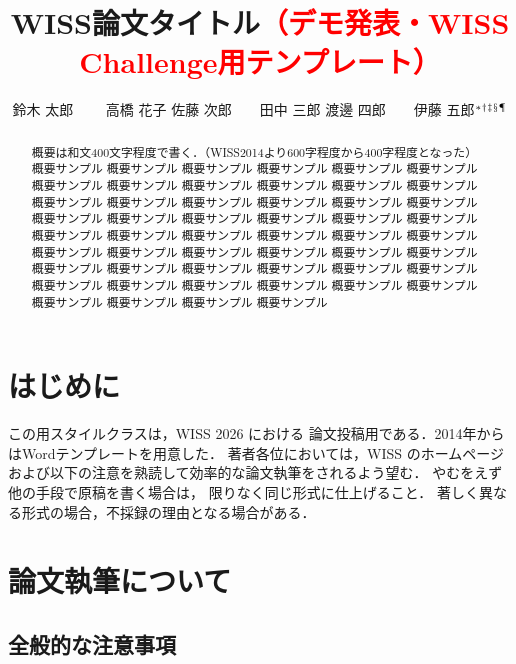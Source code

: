 \documentclass[twoside]{wiss}
\begin{document}
\title{WISS論文タイトル\textcolor{red}{（デモ発表・WISS Challenge用テンプレート）}}
\etitle{}%
%
%
%
\author{鈴木 太郎 　　高橋 花子
	佐藤 次郎　　田中 三郎
	渡邊 四郎　　伊藤 五郎${}^* {}^\dag {}^\ddag {}^\mathsection
		{}^\mathparagraph$}

\begin{abstract}
	概要は和文400文字程度で書く．（WISS2014より600字程度から400字程度となった）
	概要サンプル 概要サンプル 概要サンプル 概要サンプル 概要サンプル 概要サンプル
	概要サンプル 概要サンプル 概要サンプル 概要サンプル 概要サンプル 概要サンプル
	概要サンプル 概要サンプル 概要サンプル 概要サンプル 概要サンプル 概要サンプル
	概要サンプル 概要サンプル 概要サンプル 概要サンプル 概要サンプル 概要サンプル
	概要サンプル 概要サンプル 概要サンプル 概要サンプル 概要サンプル 概要サンプル
	概要サンプル 概要サンプル 概要サンプル 概要サンプル 概要サンプル 概要サンプル
	概要サンプル 概要サンプル 概要サンプル 概要サンプル 概要サンプル 概要サンプル
	概要サンプル 概要サンプル 概要サンプル 概要サンプル 概要サンプル 概要サンプル
	概要サンプル 概要サンプル 概要サンプル 概要サンプル
\end{abstract}

\maketitle

\section{はじめに}

この\LaTeXe{}用スタイルクラスは，WISS 2026 における
論文投稿用である．2014年からはWordテンプレートを用意した．
著者各位においては，WISS のホームページ\cite{wiss}
および以下の注意を熟読して効率的な論文執筆をされるよう望む．
やむをえず他の手段で原稿を書く場合は，
限りなく同じ形式に仕上げること．
著しく異なる形式の場合，不採録の理由となる場合がある．

\section{論文執筆について}

\subsection{全般的な注意事項}
\end{document}
